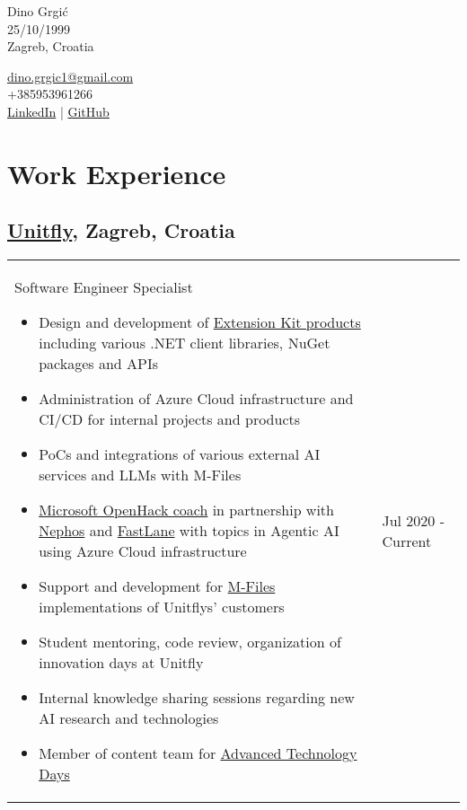 \documentclass[a4paper]{article}
\makeatletter
\newlength{\tablewidth}
\newenvironment{period}[2]{%
\newcommand{\sarma}{#2}%
\setlength{\tablewidth}{\linewidth}
\addtolength{\tablewidth}{-2\tabcolsep}
\begin{tabular}{@{}p{0.8\tablewidth}>{\raggedleft\arraybackslash}p{0.2\tablewidth}@{}}%
#1 \newline
\begin{itemize}
}{%
\end{itemize} & \sarma \\%
\end{tabular}\\
}
\makeatother
\begin{document}
\begin{minipage}{0.5\textwidth}
\LARGE{Dino Grgić}\\
\normalsize{25/10/1999} \\
\normalsize{Zagreb, Croatia}
\end{minipage}%
\hfill
\begin{minipage}{0.35\textwidth}
\raggedleft
\href{dino.grgic1@gmail.com}{dino.grgic1@gmail.com} \\
+385953961266 \\
\href{https://www.linkedin.com/in/dinogrgic/}{LinkedIn} | \href{https://github.com/dino-grgic}{GitHub} \\
\end{minipage}
\begin{minipage}{0.1\textwidth}
\end{minipage}
\hfill
\hfill
\vspace{1em}

\section{Work Experience}
\subsection{\href{https://unitfly.com/}{Unitfly}, Zagreb, Croatia}
\begin{period}{Software Engineer Specialist}{Jul 2020 - Current}
    \item Design and development of \href{https://extensionkit.unitfly.com/}{Extension Kit products} including various .NET 
    client libraries, NuGet packages and APIs
    \item Administration of Azure Cloud infrastructure and CI/CD for internal projects and products
    \item PoCs and integrations of various external AI services and LLMs with M-Files
    \item \href{https://www.flane.de/en/openhack}{Microsoft OpenHack coach} in partnership with \href{https://nephos.eu/}{Nephos} and \href{https://www.flane.de}{FastLane} with topics in Agentic AI using Azure Cloud infrastructure
    \item Support and development for \href{https://www.m-files.com/}{M-Files} implementations of Unitflys' customers
    \item Student mentoring, code review, organization of innovation days at Unitfly 
    \item Internal knowledge sharing sessions regarding new AI research and technologies
    \item Member of content team for \href{https://www.advtechdays.com/en/}{Advanced Technology Days}
\end{period}
\end{document}
